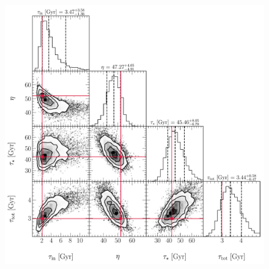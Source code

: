 \documentclass[ms.tex]{subfiles}
\begin{document}
\begin{figure}
\centering
\includegraphics[scale = 0.50]{wukong_expifr_102k4.pdf}

\end{figure}
\end{document}
